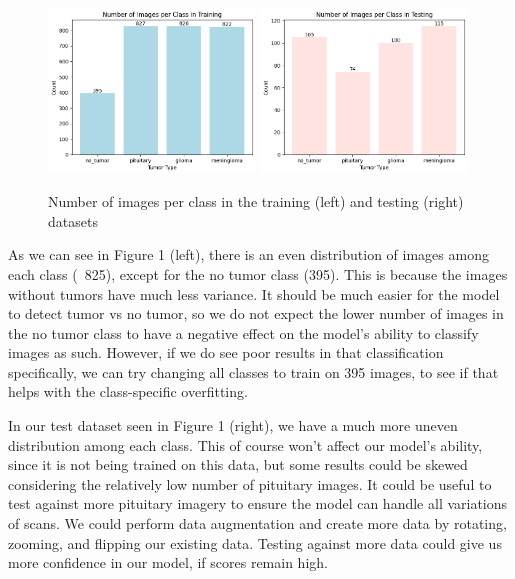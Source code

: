 \documentclass[conference]{IEEEtran}
\begin{document}
\begin{figure}[!ht]
    \centering
    \includegraphics[width=0.49\textwidth]{ImagesPerClassTraining.png}
    \hfill
    \includegraphics[width=0.49\textwidth]{ImagesPerClassTesting.png}
    \caption{\large Number of images per class in the training (left) and testing (right) datasets}
    \label{fig:images-per-class}
\end{figure}

As we can see in Figure 1 (left), there is an even distribution of images among each class (~825), except for the no tumor class (395). This is because the images without tumors have much less variance. It should be much easier for the model to detect tumor vs no tumor, so we do not expect the lower number of images in the no tumor class to have a negative effect on the model's ability to classify images as such. However, if we do see poor results in that classification specifically, we can try changing all classes to train on 395 images, to see if that helps with the class-specific overfitting.

In our test dataset seen in Figure 1 (right), we have a much more uneven distribution among each class. This of course won't affect our model's ability, since it is not being trained on this data, but some results could be skewed considering the relatively low number of pituitary images. It could be useful to test against more pituitary imagery to ensure the model can handle all variations of scans. We could perform data augmentation and create more data by rotating, zooming, and flipping our existing data. Testing against more data could give us more confidence in our model, if scores remain high.
\end{document}
